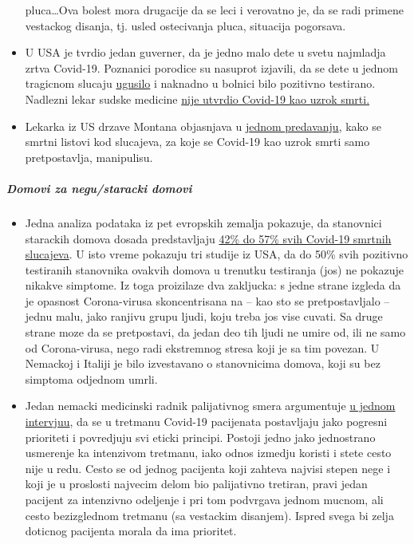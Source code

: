 \begin{itemize}
  pluca\ldots{}Ova bolest mora drugacije da se leci i verovatno je, da
  se radi primene vestackog disanja, tj. usled ostecivanja pluca,
  situacija pogorsava.
\item
  U USA je tvrdio jedan guverner, da je jedno malo dete u svetu
  najmladja zrtva Covid-19. Poznanici porodice su nasuprot izjavili, da
  se dete u jednom tragicnom slucaju
  \href{https://www.washingtonexaminer.com/news/candace-owens-accuses-connecticut-governor-of-lying-about-coronavirus-death-calls-for-resignation}{ugusilo}
  i naknadno u bolnici bilo pozitivno testirano. Nadlezni lekar sudske
  medicine
  \href{https://www.dailymail.co.uk/news/article-8193487/Coroner-refuses-rule-COVID-19-cause-death-six-week-old-Connecticut-baby.html}{nije
  utvrdio Covid-19 kao uzrok smrti.}
\item
  Lekarka iz US drzave Montana objasnjava u
  \href{https://www.youtube.com/watch?v=V0lIWZpiRU0}{jednom predavanju},
  kako se smrtni listovi kod slucajeva, za koje se Covid-19 kao uzrok
  smrti samo pretpostavlja, manipulisu.
\end{itemize}

\hypertarget{domovi-za-negustaracki-domovi}{%
\subparagraph{\texorpdfstring{\textbf{Domovi za negu/staracki
domovi}}{Domovi za negu/staracki domovi}}\label{domovi-za-negustaracki-domovi}}

\begin{itemize}
\tightlist
\item
  Jedna analiza podataka iz pet evropskih zemalja pokazuje, da
  stanovnici starackih domova dosada predstavljaju
  \href{https://ltccovid.org/2020/04/12/mortality-associated-with-covid-19-outbreaks-in-care-homes-early-international-evidence/}{42\%
  do 57\% svih Covid-19 smrtnih slucajeva}. U isto vreme pokazuju tri
  studije iz USA, da do 50\% svih pozitivno testiranih stanovnika
  ovakvih domova u trenutku testiranja (jos) ne pokazuje nikakve
  simptome. Iz toga proizilaze dva zakljucka: s jedne strane izgleda da
  je opasnost Corona-virusa skoncentrisana na -- kao sto se
  pretpostavljalo -- jednu malu, jako ranjivu grupu ljudi, koju treba
  jos vise cuvati. Sa druge strane moze da se pretpostavi, da jedan deo
  tih ljudi ne umire od, ili ne samo od Corona-virusa, nego radi
  ekstremnog stresa koji je sa tim povezan. U Nemackoj i Italiji je bilo
  izvestavano o stanovnicima domova, koji su bez simptoma odjednom
  umrli.
\item
  Jedan nemacki medicinski radnik palijativnog smera argumentuje
  \href{https://www.deutschlandfunk.de/palliativmediziner-zu-covid-19-behandlungen-sehr-falsche.694.de.html?dram:article_id=474488}{u
  jednom intervjuu}, da se u tretmanu Covid-19 pacijenata postavljaju
  jako pogresni prioriteti i povredjuju svi eticki principi. Postoji
  jedno jako jednostrano usmerenje ka intenzivom tretmanu, iako odnos
  izmedju koristi i stete cesto nije u redu. Cesto se od jednog
  pacijenta koji zahteva najvisi stepen nege i koji je u proslosti
  najvecim delom bio palijativno tretiran, pravi jedan pacijent za
  intenzivno odeljenje i pri tom podvrgava jednom mucnom, ali cesto
  bezizglednom tretmanu (sa vestackim disanjem). Ispred svega bi zelja
  doticnog pacijenta morala da ima prioritet.
\end{itemize}

